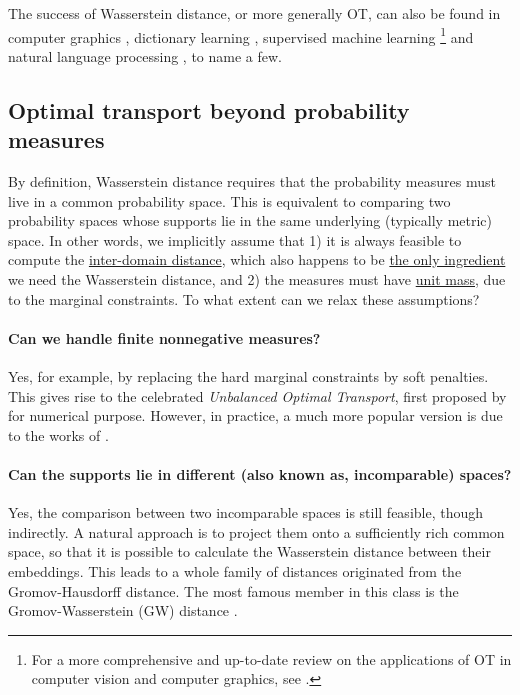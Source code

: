 The success of Wasserstein distance, or more generally OT, can also be found in
computer graphics \citep{Bonneel16,Solomon15}, dictionary learning \citep{Rolet16},
supervised machine learning \citep{Frogner15}
\footnote{For a more comprehensive and up-to-date review on the applications of OT in
computer vision and computer graphics, see \citep{Bonneel23}.} and
natural language processing \citep{Kusner15}, to name a few.

\subsection{Optimal transport beyond probability measures}

By definition, Wasserstein distance requires that the probability measures
must live in a common probability space. This is equivalent to comparing two
probability spaces whose supports lie in the same underlying (typically metric) space.
In other words, we implicitly assume that 1) it is always feasible to compute
the \underline{inter-domain distance}, which also happens to be \underline{the only ingredient}
we need the Wasserstein distance, and 2) the measures must have \underline{unit mass},
due to the marginal constraints. To what extent can we relax these assumptions?

\paragraph{Can we handle finite nonnegative measures?} Yes, for example,
by replacing the hard marginal constraints by soft penalties.
This gives rise to the celebrated \textit{Unbalanced Optimal Transport}, first proposed by
\citet{Benamou03} for numerical purpose. However, in practice, a much more popular version
is due to the works of \citet{Liero18,Frogner15}.

\paragraph{Can the supports lie in different (also known as, incomparable) spaces?}
Yes, the comparison between two incomparable spaces is still feasible, though indirectly.
A natural approach is to project them onto a sufficiently rich common space,
so that it is possible to calculate the Wasserstein distance between their embeddings.
This leads to a whole family of distances originated from the Gromov-Hausdorff distance.
The most famous member in this class is the Gromov-Wasserstein (GW) distance \citep{Memoli07,Memoli11}.


